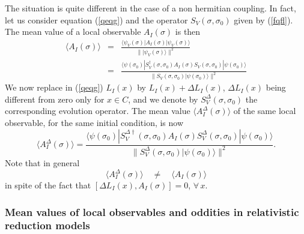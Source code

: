 \documentclass[12pt]{article}
\begin{document}
The situation is quite different in the case of a non hermitian
coupling. In fact, let us consider equation (\ref{qeqg}) and the
operator $S_{V}(\sigma, \sigma_{0})$ given by (\ref{fqfl}). The
mean value of a local observable $A_{I}(\sigma)$ is then
\begin{eqnarray}
\langle A_{I}(\sigma) \rangle & = & \frac{\langle
\psi_{V}(\sigma)| A_{I}(\sigma) | \psi_{V}(\sigma) \rangle}{
\| |\psi_{V}(\sigma)\rangle \|^{2}} \nonumber \\
& = & \frac{\langle \psi(\sigma_{0})| S_{V}^{\dagger}(\sigma,
\sigma_{0}) A_{I}(\sigma) S_{V}(\sigma, \sigma_{0}) |
\psi(\sigma_{0}) \rangle}{ \| S_{V}(\sigma, \sigma_{0})
|\psi(\sigma_{0})\rangle \|^{2}}
\end{eqnarray}
We now replace in (\ref{qeqg}) $L_{I}(x)$ by $L_{I}(x) + \Delta
L_{I}(x)$, $\Delta L_{I}(x)$ being different from zero only for $x
\in C$, and we denote by $S_{V}^{\Delta}(\sigma, \sigma_{0})$ the
corresponding evolution operator. The mean value $\langle
A_{I}^{\Delta}(\sigma) \rangle$ of the same local observable, for
the same initial condition, is now
\begin{equation}
\langle A_{I}^{\Delta}(\sigma) \rangle = \frac{\langle
\psi(\sigma_{0})| S_{V}^{\Delta\dagger}(\sigma, \sigma_{0})
A_{I}(\sigma) S_{V}^{\Delta}(\sigma, \sigma_{0}) |
\psi(\sigma_{0}) \rangle}{ \| S_{V}^{\Delta}(\sigma, \sigma_{0})
|\psi(\sigma_{0})\rangle \|^{2}}.
\end{equation}
Note that in general
\begin{equation}
\langle A_{I}^{\Delta}(\sigma) \rangle \quad \neq \quad \langle
A_{I}(\sigma) \rangle
\end{equation}
in spite of the fact that $[\Delta L_{I}(x), A_{I}(\sigma)] = 0$,
$\forall\, x$.

\subsubsection{Mean values of local observables and oddities in
relativistic reduction models} \label{sec1023}
\end{document}
